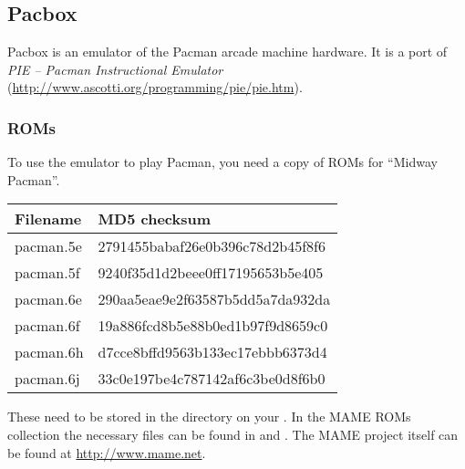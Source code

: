 \subsection{Pacbox}
Pacbox is an emulator of the Pacman arcade machine hardware. It is a port of
\emph{PIE -- Pacman Instructional Emulator}
(\url{http://www.ascotti.org/programming/pie/pie.htm}).


\subsubsection{ROMs}
To use the emulator to play Pacman, you need a copy of ROMs for 
``Midway Pacman''.
\begin{center}
  \begin{tabular}{ll}\toprule
    \textbf{Filename} & \textbf{MD5 checksum}\\\midrule
    pacman.5e & 2791455babaf26e0b396c78d2b45f8f6\\
    pacman.5f & 9240f35d1d2beee0ff17195653b5e405\\
    pacman.6e & 290aa5eae9e2f63587b5dd5a7da932da\\
    pacman.6f & 19a886fcd8b5e88b0ed1b97f9d8659c0\\
    pacman.6h & d7cce8bffd9563b133ec17ebbb6373d4\\
    pacman.6j & 33c0e197be4c787142af6c3be0d8f6b0\\\bottomrule
  \end{tabular}
\end{center}

These need to be stored in the  directory on your 
\dap. In the MAME ROMs collection the necessary files can be found in 
 and . The MAME project itself can be 
found at \url{http://www.mame.net}.

